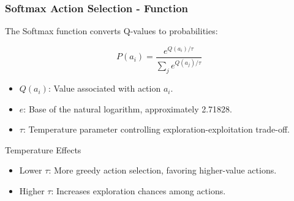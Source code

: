 \documentclass[aspectratio=169]{beamer}
\begin{document}
\begin{frame}[fragile]
    \frametitle{Softmax Action Selection - Function}
    The Softmax function converts Q-values to probabilities:

    \begin{equation}
        P(a_i) = \frac{e^{Q(a_i) / \tau}}{\sum_{j} e^{Q(a_j) / \tau}}
    \end{equation}
    
    \begin{itemize}
        \item \(Q(a_i)\): Value associated with action \(a_i\).
        \item \(e\): Base of the natural logarithm, approximately 2.71828.
        \item \(\tau\): Temperature parameter controlling exploration-exploitation trade-off.
    \end{itemize}
    
    \begin{block}{Temperature Effects}
        \begin{itemize}
            \item Lower \(\tau\): More greedy action selection, favoring higher-value actions.
            \item Higher \(\tau\): Increases exploration chances among actions.
        \end{itemize}
    \end{block}
\end{frame}
\end{document}
